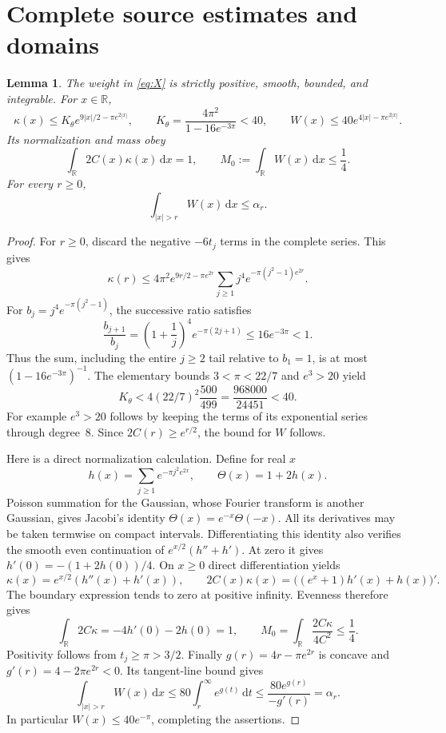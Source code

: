 \documentclass[11pt]{article}
\newtheorem{lemma}[theorem]{Lemma}
\theoremstyle{remark}\newtheorem{remark}[theorem]{Remark}
\newcommand{\R}{\mathbb R}
\newcommand{\dd}{\,\mathrm d}
\numberwithin{equation}{section}
\begin{document}
\section{Complete source estimates and domains}\label{sec:source}
\begin{lemma}\label{lem:source}
The weight in \eqref{eq:X} is strictly positive, smooth, bounded, and integrable. For $x\in\R$,
\begin{equation}\label{eq:envelope}
 \kappa(x)\le K_\theta e^{9|x|/2-\pi e^{2|x|}},\qquad
 K_\theta=\frac{4\pi^2}{1-16e^{-3\pi}}<40,
 \qquad W(x)\le40e^{4|x|-\pi e^{2|x|}}.
\end{equation}
Its normalization and mass obey
\begin{equation}\label{eq:mass}
 \int_\R2C(x)\kappa(x)\dd x=1,\qquad
 M_0:=\int_\R W(x)\dd x\le\frac14.
\end{equation}
For every $r\ge0$,
\begin{equation}\label{eq:tail}
 \int_{|x|>r}W(x)\dd x\le\alpha_r.
\end{equation}
\end{lemma}
\begin{proof}
For $r\ge0$, discard the negative $-6t_j$ terms in the complete series. This gives
\[
 \kappa(r)\le4\pi^2e^{9r/2-\pi e^{2r}}
 \sum_{j\ge1}j^4e^{-\pi(j^2-1)e^{2r}}.
\]
For $b_j=j^4e^{-\pi(j^2-1)}$, the successive ratio satisfies
\[
 \frac{b_{j+1}}{b_j}
 =\left(1+\frac1j\right)^4e^{-\pi(2j+1)}
 \le16e^{-3\pi}<1.
\]
Thus the sum, including the entire $j\ge2$ tail relative to $b_1=1$, is at most $(1-16e^{-3\pi})^{-1}$. The elementary bounds $3<\pi<22/7$ and $e^3>20$ yield
\[
 K_\theta<4(22/7)^2\frac{500}{499}
 =\frac{968000}{24451}<40.
\]
For example $e^3>20$ follows by keeping the terms of its exponential series through degree~8. Since $2C(r)\ge e^{r/2}$, the bound for $W$ follows.

Here is a direct normalization calculation. Define for real $x$
\[
 h(x)=\sum_{j\ge1}e^{-\pi j^2e^{2x}},\qquad \Theta(x)=1+2h(x).
\]
Poisson summation for the Gaussian, whose Fourier transform is another Gaussian, gives Jacobi's identity
$\Theta(x)=e^{-x}\Theta(-x)$. All its derivatives may be taken termwise on compact intervals. Differentiating this identity also verifies the smooth even continuation of $e^{x/2}(h''+h')$. At zero it gives
$h'(0)=-(1+2h(0))/4$. On $x\ge0$ direct differentiation yields
\[
 \kappa(x)=e^{x/2}(h''(x)+h'(x)),\qquad
 2C(x)\kappa(x)=\big((e^x+1)h'(x)+h(x)\big)'.
\]
The boundary expression tends to zero at positive infinity. Evenness therefore gives
\[
 \int_\R2C\kappa=-4h'(0)-2h(0)=1,
 \qquad M_0=\int_\R\frac{2C\kappa}{4C^2}\le\frac14.
\]
Positivity follows from $t_j\ge\pi>3/2$. Finally $g(r)=4r-\pi e^{2r}$ is concave and $g'(r)=4-2\pi e^{2r}<0$. Its tangent-line bound gives
\[
 \int_{|x|>r}W(x)\dd x
 \le80\int_r^\infty e^{g(t)}\dd t
 \le\frac{80e^{g(r)}}{-g'(r)}=\alpha_r.
\]
In particular $W(x)\le40e^{-\pi}$, completing the assertions.
\end{proof}
\end{document}
